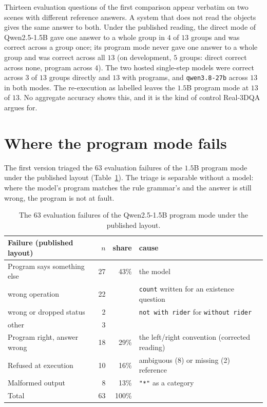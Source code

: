 \documentclass[11pt,a4paper]{article}
\newcommand{\code}[1]{\texttt{\small #1}}
\begin{document}
Thirteen evaluation questions of the first comparison appear verbatim on two
scenes with different reference answers. A system that does not read the
objects gives the same answer to both. Under the published reading, the
direct mode of Qwen2.5-1.5B gave one answer to a whole group in $4$ of $13$
groups and was correct across a group once; its program mode never gave one
answer to a whole group and was correct across all $13$ (on development,
$5$ groups: direct correct across none, program across $4$). The two hosted
single-step models were correct across $3$ of $13$ groups directly and $13$
with programs, and \code{qwen3.8-27b} across $13$ in both modes. The
re-execution as labelled leaves the $1.5$B program mode at $13$ of $13$. No
aggregate accuracy shows this, and it is the kind of control Real-3DQA
\cite{real3dqa} argues for.

\section{Where the program mode fails}
\label{sec:failures}

The first version triaged the $63$ evaluation failures of the $1.5$B program
mode under the published layout (Table~\ref{tab:triage}). The triage is
separable without a model: where the model's program matches the rule
grammar's and the answer is still wrong, the program is not at fault.

\begin{table}[ht]
\centering
\small
\begin{tabular}{lrrl}
\toprule
Failure (published layout) & $n$ & share & cause \\
\midrule
Program says something else   & 27 & 43\% & the model \\
\quad wrong operation         & 22 &      & \code{count} written for an existence question \\
\quad wrong or dropped status & 2  &      & \code{not with rider} for \code{without rider} \\
\quad other                   & 3  &      & \\
Program right, answer wrong   & 18 & 29\% & the left/right convention (corrected reading) \\
Refused at execution          & 10 & 16\% & ambiguous (8) or missing (2) reference \\
Malformed output              & 8  & 13\% & \code{"*"} as a category \\
\midrule
Total                         & 63 & 100\% & \\
\bottomrule
\end{tabular}
\caption{The $63$ evaluation failures of the Qwen2.5-1.5B program mode under
the published layout.}
\label{tab:triage}
\end{table}
\end{document}
